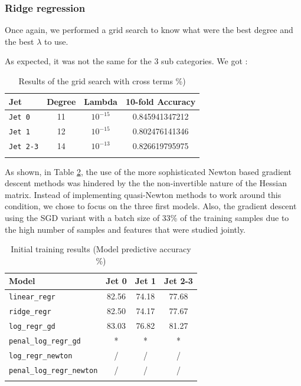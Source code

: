 \documentclass[10pt,conference,compsocconf]{IEEEtran}
\begin{document}
\subsubsection{Ridge regression}

Once again, we performed a grid search to know what were the best degree and the best $\lambda$ to use.

As expected, it was not the same for the 3 sub categories. We got :
\begin{table}[h!]
\centering
\caption{Results of the grid search with cross terms \%)}
\footnotesize
\hspace{-0.2cm}
\begin{tabular}{ l| ccc } 
 \hline
   Jet & Degree & Lambda & 10-fold Accuracy  \\
 \hline
   \verb+Jet 0+  & 11 & $10^{-15}$  & 0.845941347212  \\
   \verb+Jet 1+  & 12 & $10^{-15}$  & 0.802476141346 \\
   \verb+Jet 2-3+  & 14  &  $10^{-13}$ & 0.826619795975 \\
  \hline
\label{grid_search_ridge_cross}
\end{tabular}
\end{table}


As shown, in Table \ref{tab_first_run}, the use of the  more sophisticated Newton based  gradient descent methods was hindered by the the non-invertible nature of the Hessian matrix. Instead of implementing quasi-Newton methods to work around this condition, we chose to focus on the three first models. Also, the gradient descent using the SGD variant with a batch size of 33\% of the training samples due to the high number of samples and features that were studied jointly. 
 
\begin{table}[h!]
\centering
\caption{Initial training results (Model predictive accuracy \%)}
\footnotesize
\hspace{-0.2cm}
\begin{tabular}{ l| ccc } 
 \hline
   Model & Jet 0 & Jet 1 & Jet 2-3  \\
 \hline
   \verb+linear_regr+  & 82.56 &74.18  & 77.68  \\
   \verb+ridge_regr+  & 82.50 & 74.17  & 77.67 \\
   \verb+log_regr_gd+  & 83.03  &  76.82 & 81.27 \\
   \verb+penal_log_regr_gd+  & * & * &  * \\ 
   \verb+log_regr_newton+  & / & / & / \\
   \verb+penal_log_regr_newton+ &  / & / & / \\
  \hline
\label{tab_first_run}
\end{tabular}
\end{table}
\end{document}
